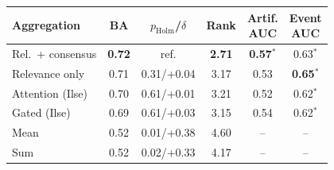 \begin{tabular*}{\columnwidth}{@{\extracolsep{\fill}}lccccc}
\toprule
Aggregation & BA & $p_{\mathrm{Holm}}$/$\delta$ & Rank & \shortstack{Artif.\\AUC} & \shortstack{Event\\AUC} \\
\midrule
Rel.\ + consensus & \textbf{0.72} & ref. & \textbf{2.71} & \textbf{0.57}$^{*}$ & 0.63$^{*}$ \\
Relevance only & 0.71 & 0.31/+0.04 & 3.17 & 0.53 & \textbf{0.65}$^{*}$ \\
Attention (Ilse) & 0.70 & 0.61/+0.01 & 3.21 & 0.52 & 0.62$^{*}$ \\
Gated (Ilse) & 0.69 & 0.61/+0.03 & 3.15 & 0.54 & 0.62$^{*}$ \\
Mean & 0.52 & 0.01/+0.38 & 4.60 & -- & -- \\
Sum & 0.52 & 0.02/+0.33 & 4.17 & -- & -- \\
\bottomrule
\end{tabular*}
